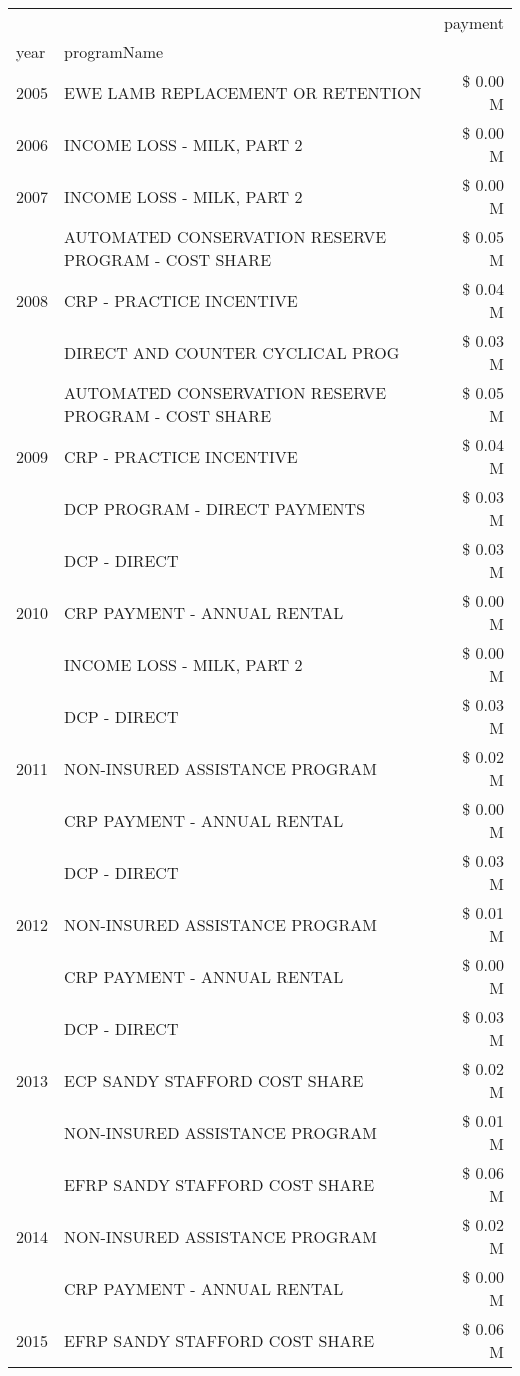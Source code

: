 \begin{tabular}{llr}
\toprule
 &  & payment \\
year & programName &  \\
\midrule
2005 & EWE LAMB REPLACEMENT OR RETENTION & \$ 0.00 M \\
\cline{1-3}
2006 & INCOME LOSS - MILK, PART 2 & \$ 0.00 M \\
\cline{1-3}
2007 & INCOME LOSS - MILK, PART 2 & \$ 0.00 M \\
\cline{1-3}
\multirow[t]{3}{*}{2008} & AUTOMATED CONSERVATION RESERVE PROGRAM - COST SHARE & \$ 0.05 M \\
 & CRP - PRACTICE INCENTIVE & \$ 0.04 M \\
 & DIRECT AND COUNTER CYCLICAL PROG & \$ 0.03 M \\
\cline{1-3}
\multirow[t]{3}{*}{2009} & AUTOMATED CONSERVATION RESERVE PROGRAM - COST SHARE & \$ 0.05 M \\
 & CRP - PRACTICE INCENTIVE & \$ 0.04 M \\
 & DCP PROGRAM - DIRECT PAYMENTS & \$ 0.03 M \\
\cline{1-3}
\multirow[t]{3}{*}{2010} & DCP - DIRECT & \$ 0.03 M \\
 & CRP PAYMENT - ANNUAL RENTAL & \$ 0.00 M \\
 & INCOME LOSS - MILK, PART 2 & \$ 0.00 M \\
\cline{1-3}
\multirow[t]{3}{*}{2011} & DCP - DIRECT & \$ 0.03 M \\
 & NON-INSURED ASSISTANCE PROGRAM & \$ 0.02 M \\
 & CRP PAYMENT - ANNUAL RENTAL & \$ 0.00 M \\
\cline{1-3}
\multirow[t]{3}{*}{2012} & DCP - DIRECT & \$ 0.03 M \\
 & NON-INSURED ASSISTANCE PROGRAM & \$ 0.01 M \\
 & CRP PAYMENT - ANNUAL RENTAL & \$ 0.00 M \\
\cline{1-3}
\multirow[t]{3}{*}{2013} & DCP - DIRECT & \$ 0.03 M \\
 & ECP SANDY STAFFORD COST SHARE & \$ 0.02 M \\
 & NON-INSURED ASSISTANCE PROGRAM & \$ 0.01 M \\
\cline{1-3}
\multirow[t]{3}{*}{2014} & EFRP SANDY STAFFORD COST SHARE & \$ 0.06 M \\
 & NON-INSURED ASSISTANCE PROGRAM & \$ 0.02 M \\
 & CRP PAYMENT - ANNUAL RENTAL & \$ 0.00 M \\
\cline{1-3}
\multirow[t]{3}{*}{2015} & EFRP SANDY STAFFORD COST SHARE & \$ 0.06 M \\

\end{tabular}
